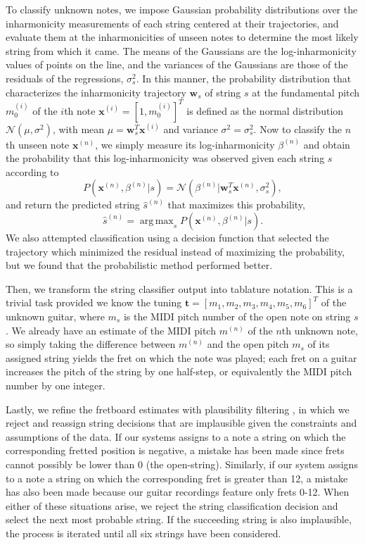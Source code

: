 \documentclass[convention,peer-reviewed]{aesconf}
\DeclareMathOperator*{\argmax}{arg\,max}
\begin{document}
To classify unknown notes, we impose Gaussian probability distributions over the inharmonicity measurements of each string centered at their trajectories, and evaluate them at the inharmonicities of unseen notes to determine the most likely string from which it came. The means of the Gaussians are the log-inharmonicity values of points on the line, and the variances of the Gaussians are those of the residuals of the regressions, $\sigma_s^2$. In this manner, the probability distribution that characterizes the inharmonicity trajectory $\mathbf{w}_s$ of string $s$ at the fundamental pitch $m_0^{(i)}$ of the $i$th note $\mathbf{x}^{(i)} = [1,m_0^{(i)}]^T$ is defined as the normal distribution $\mathcal{N}(\mu, \sigma^2)$, with mean $\mu = \mathbf{w}_s^T\mathbf{x}^{(i)}$ and variance $\sigma^2 = \sigma_s^2$. Now to classify the $n$th unseen note $\mathbf{x}^{(n)}$, we simply measure its log-inharmonicity $\beta^{(n)}$ and obtain the probability that this log-inharmonicity was observed given each string $s$ according to
\begin{equation}
P(\mathbf{x}^{(n)},\beta^{(n)} | s) = \mathcal{N}(\beta^{(n)} | \mathbf{w}_s^T\mathbf{x}^{(n)},\sigma_s^2),
\end{equation}
and return the predicted string $\hat{s}^{(n)}$ that maximizes this probability,
\begin{equation}
\hat{s}^{(n)} = \argmax_{s}P(\mathbf{x}^{(n)},\beta^{(n)} | s).
\label{eq:string-argmax}
\end{equation}
We also attempted classification using a decision function that selected the trajectory which minimized the residual instead of maximizing the probability, but we found that the probabilistic method performed better.

Then, we transform the string classifier output into tablature notation. This is a trivial task provided we know the tuning $\mathbf{t} = [m_1, m_2, m_3, m_4, m_5, m_6]^T$ of the unknown guitar, where $m_s$ is the MIDI pitch number of the open note on string $s$. We already have an estimate of the MIDI pitch $m^{(n)}$ of the $n$th unknown note, so simply taking the difference between $m^{(n)}$ and the open pitch $m_s$ of its assigned string yields the fret on which the note was played; each fret on a guitar increases the pitch of the string by one half-step, or equivalently the MIDI pitch number by one integer.

Lastly, we refine the fretboard estimates with plausibility filtering \citep{abesser2012}, in which we reject and reassign string decisions that are implausible given the constraints and assumptions of the data. If our systems assigns to a note a string on which the corresponding fretted position is negative, a mistake has been made since frets cannot possibly be lower than 0 (the open-string). Similarly, if our system assigns to a note a string on which the corresponding fret is greater than 12, a mistake has also been made because our guitar recordings feature only frets 0-12. When either of these situations arise, we reject the string classification decision and select the next most probable string. If the succeeding string is also implausible, the process is iterated until all six strings have been considered.
\end{document}
